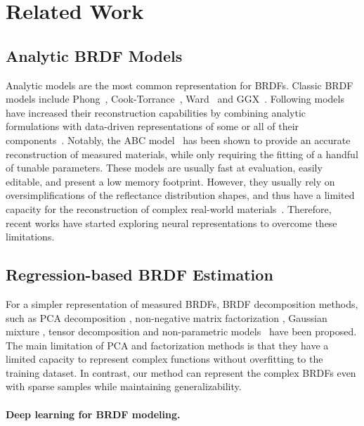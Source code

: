 \section{Related Work}
\label{sec:relatedwork}


\subsection{Analytic BRDF Models}
Analytic models are the most common representation for BRDFs. Classic BRDF models include Phong~\cite{blinn77}, Cook-Torrance~\cite{cooktorrance1982}, Ward~\cite{ward1992} and GGX~\cite{walter2007microfacet}. Following models have increased their reconstruction capabilities by combining analytic formulations with data-driven representations of some or all of their components~\cite{dupuy2015, ashikhmin2007, bagher2016}. Notably, the ABC model~\cite{low2012} has been shown to provide an accurate reconstruction of measured materials, while only requiring the fitting of a handful of tunable parameters. These models are usually fast at evaluation, easily editable, and present a low memory footprint. However, they usually rely on oversimplifications of the reflectance distribution shapes, and thus have a limited capacity for the reconstruction of complex real-world materials~\cite{ngan2005, guarnera2016}. Therefore, recent works have started exploring neural representations to overcome these limitations.



\subsection{Regression-based BRDF Estimation}
For a simpler representation of measured BRDFs, BRDF decomposition methods, such as PCA decomposition 
\cite{matusik2003data, nielsen2015optimal, serrano2018intuitive}, non-negative matrix factorization \cite{lawrence2004efficient, lawrence2006inverse}, Gaussian mixture \cite{sun2007interactive}, tensor decomposition \cite{bilgili2011general, tongbuasirilai2020compact} 
and non-parametric models~\cite{bagher2016non} have been proposed. The main limitation of PCA and factorization methods is  that they have a limited capacity to represent complex functions without overfitting to the training dataset. In contrast, our method can represent the complex BRDFs even with sparse samples while maintaining generalizability.


\paragraph{Deep learning for BRDF modeling.}

